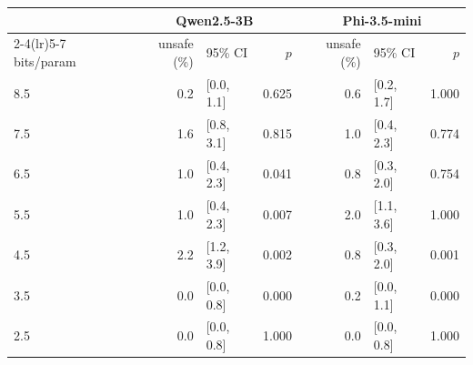 \begin{tabular}{lrlrrlr}
\toprule
 & \multicolumn{3}{c}{Qwen2.5-3B} & \multicolumn{3}{c}{Phi-3.5-mini} \\
\cmidrule(lr){2-4}\cmidrule(lr){5-7}
bits/param & unsafe (\%) & 95\% CI & $p$ & unsafe (\%) & 95\% CI & $p$ \\
\midrule
8.5 & 0.2 & [0.0, 1.1] & 0.625 & 0.6 & [0.2, 1.7] & 1.000 \\
7.5 & 1.6 & [0.8, 3.1] & 0.815 & 1.0 & [0.4, 2.3] & 0.774 \\
6.5 & 1.0 & [0.4, 2.3] & 0.041 & 0.8 & [0.3, 2.0] & 0.754 \\
5.5 & 1.0 & [0.4, 2.3] & 0.007 & 2.0 & [1.1, 3.6] & 1.000 \\
4.5 & 2.2 & [1.2, 3.9] & 0.002 & 0.8 & [0.3, 2.0] & 0.001 \\
3.5 & 0.0 & [0.0, 0.8] & 0.000 & 0.2 & [0.0, 1.1] & 0.000 \\
2.5 & 0.0 & [0.0, 0.8] & 1.000 & 0.0 & [0.0, 0.8] & 1.000 \\
\bottomrule
\end{tabular}
